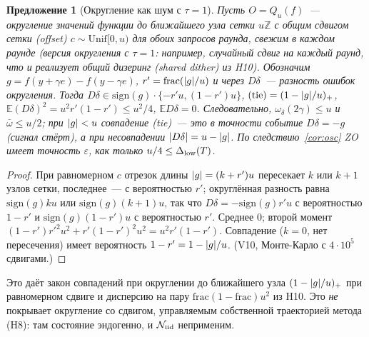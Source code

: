 \documentclass[11pt,a4paper]{article}
\numberwithin{equation}{section}
\newtheorem{proposition}[theorem]{Предложение}
\theoremstyle{definition}
\theoremstyle{remark}
\newcommand{\E}{\mathbb E}\newcommand{\R}{\mathbb R}\newcommand{\Z}{\mathbb Z}\let\Prob\relax\newcommand{\Prob}{\mathbb P}
\newcommand{\cN}{\mathcal N}\newcommand{\cA}{\mathcal A}\newcommand{\cG}{\mathcal G}\newcommand{\cF}{\mathcal F}
\newcommand{\Unif}{\mathrm{Unif}}\newcommand{\TV}{\mathrm{TV}}\newcommand{\BC}{\mathrm{BC}}\newcommand{\tmix}{t_{\rm mix}}
\newcommand{\wbar}{\bar\omega}\newcommand{\Atwo}{\cA^{\rm 2pt}_\gamma}
\begin{document}
\begin{proposition}[Округление как шум с $\tau=1$]\label{prop:round}
Пусть $O=Q_u(f)$~--- округление значений функции до ближайшего узла сетки $u\Z$ с общим сдвигом сетки (offset) $c\sim\Unif[0,u)$ для обоих запросов раунда, свежим в каждом раунде (версия округления с $\tau=1$: например, случайный сдвиг на каждый раунд, что и реализует общий дизеринг (shared dither) из H10). Обозначим $g=f(y+\gamma e)-f(y-\gamma e)$, $r'=\mathrm{frac}(\lvert g\rvert/u)$ и через $D\delta$~--- разность ошибок округления. Тогда $D\delta\in\mathrm{sign}(g)\cdot\{-r'u,(1-r')u\}$, $\Prob(\mathrm{tie})=(1-\abs g/u)_+$, $\E(D\delta)^2=u^2r'(1-r')\le u^2/4$, $\E D\delta=0$. Следовательно, $\omega_\delta(2\gamma)\le u$ и $\wbar\le u/2$; при $\lvert g\rvert<u$ совпадение (tie)~--- это в точности событие $D\delta=-g$ (сигнал стёрт), а при несовпадении $\lvert D\delta\rvert=u-\lvert g\rvert$. По следствию~\ref{cor:osc} ZO имеет точность $\varepsilon$, как только $u/4\le\Delta_{\rm low}(T)$.
\end{proposition}
\begin{proof}
При равномерном $c$ отрезок длины $\lvert g\rvert=(k+r')u$ пересекает $k$ или $k+1$ узлов сетки, последнее~--- с вероятностью $r'$; округлённая разность равна $\mathrm{sign}(g)ku$ или $\mathrm{sign}(g)(k+1)u$, так что $D\delta=-\mathrm{sign}(g)r'u$ с вероятностью $1-r'$ и $\mathrm{sign}(g)(1-r')u$ с вероятностью $r'$. Среднее $0$; второй момент $(1-r')r'^2u^2+r'(1-r')^2u^2=u^2r'(1-r')$. Совпадение ($k=0$, нет пересечения) имеет вероятность $1-r'=1-\lvert g\rvert/u$. (V10, Монте-Карло с $4\cdot10^5$ сдвигами.)
\end{proof}
Это даёт закон совпадений при округлении до ближайшего узла $(1-\lvert g\rvert/u)_+$ при равномерном сдвиге и дисперсию на пару $\mathrm{frac}(1-\mathrm{frac})u^2$ из H10. Это \emph{не} покрывает округление со сдвигом, управляемым собственной траекторией метода (H8): там состояние эндогенно, и $\cN_\iid$ неприменим.
\end{document}
